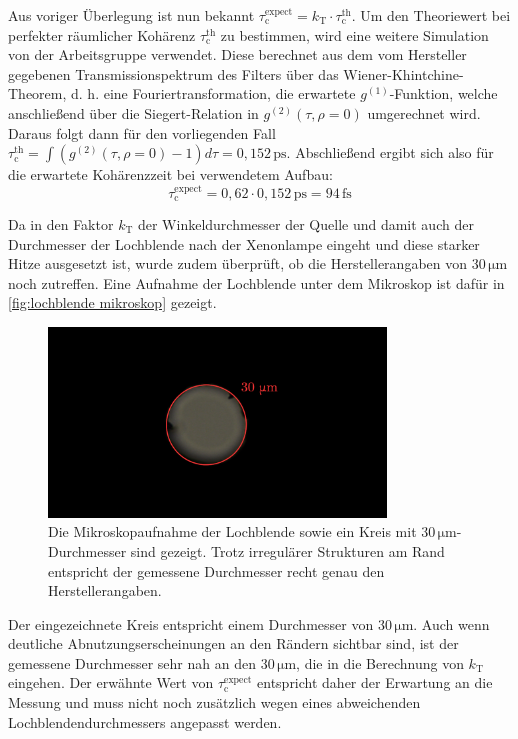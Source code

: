Aus voriger Überlegung ist nun bekannt $\tau_{\mathrm{c}}^{\mathrm{expect}} = k_\mathrm{T}\cdot\tau_{\mathrm{c}}^{\mathrm{th}}$. 
Um den Theoriewert bei perfekter räumlicher Kohärenz $\tau_{\mathrm{c}}^{\mathrm{th}}$ zu bestimmen, wird eine weitere Simulation von der Arbeitsgruppe verwendet. 
Diese berechnet aus dem vom Hersteller gegebenen Transmissionspektrum des Filters über das Wiener-Khintchine-Theorem, d. h. eine Fouriertransformation, die erwartete $g^{(1)}$-Funktion, welche anschließend über die Siegert-Relation in $g^{(2)}(\tau, \rho=0)$ umgerechnet wird. 
Daraus folgt dann für den vorliegenden Fall $\tau_{\mathrm{c}}^{\mathrm{th}} = \int \left(g^{(2)}(\tau, \rho=0) -1\right) d\tau = 0{,}152\,\mathrm{ps}$. 
Abschließend ergibt sich also für die erwartete Kohärenzzeit bei verwendetem Aufbau:
\begin{equation}
    \tau_{\mathrm{c}}^{\mathrm{expect}} = 0{,}62 \cdot 0{,}152\,\mathrm{ps} = 94\,\mathrm{fs}
    \label{eq:tau_c_th}
\end{equation}

Da in den Faktor $k_\mathrm{T}$ der Winkeldurchmesser der Quelle und damit auch der Durchmesser der Lochblende nach der Xenonlampe eingeht und diese starker Hitze ausgesetzt ist, wurde zudem überprüft, ob die Herstellerangaben von 30\,$\mathrm{\mu m}$ noch zutreffen. 
Eine Aufnahme der Lochblende unter dem Mikroskop ist dafür in \autoref{fig:lochblende mikroskop} gezeigt. 
\begin{figure}[h]
    \centering
    \includegraphics[width=0.8\textwidth]{images/Aufbau/Lochblende_Mikroskop.png}
    \caption{Die Mikroskopaufnahme der Lochblende sowie ein Kreis mit $30\,\mathrm{\mu m}$-Durchmesser sind gezeigt. Trotz irregulärer Strukturen am Rand entspricht der gemessene Durchmesser recht genau den Herstellerangaben.}
    \label{fig:lochblende mikroskop}
\end{figure}
Der eingezeichnete Kreis entspricht einem Durchmesser von $30\,\mathrm{\mu m}$. 
Auch wenn deutliche Abnutzungserscheinungen an den Rändern sichtbar sind, ist der gemessene Durchmesser sehr nah an den $30\,\mathrm{\mu m}$, die in die Berechnung von $k_\mathrm{T}$ eingehen. 
Der erwähnte Wert von $\tau_{\mathrm{c}}^{\mathrm{expect}}$ entspricht daher der Erwartung an die Messung und muss nicht noch zusätzlich wegen eines abweichenden Lochblendendurchmessers angepasst werden. 
